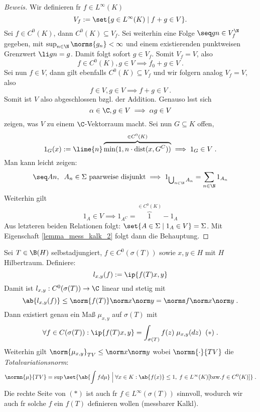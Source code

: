 \begin{proof}[Beweis]
	Wir definieren f\us r \(f\in L^\infty(K)\)
	\[V_f := \set{g\in L^\infty(K)\;\vert\; f+g \in V}.\]
	Sei \(f\in C^0(K)\), dann \(C^0(K)\subseteq V_f\). Sei weiterhin eine Folge \(\seq gn \in V_f^\N\) gegeben, mit \(\sup_{n\in\N} \norms{g_n} < \infty\) und einem existierenden punktweisen Grenzwert \(\li gn = g\). Damit folgt sofort \(g\in V_f\). Somit \(V_f = V\), also 
	\[f \in C^0(K), g\in V \implies f_0 + g \in V\;.\]
	Sei nun \(f\in V\), dann gilt ebenfalls \(C^0(K) \subseteq V_f\) und wir folgern analog \(V_f = V\), also 
	\[f\in V, g\in V \implies f + g \in V\;.\] 
	Somit ist $V$ also abgeschlossen bzgl. der Addition. Genauso l\as sst sich \[\alpha \in \C, g\in V \implies \alpha g \in V\] zeigen, was $V$ zu einem \(\C\)-Vektorraum macht.
	Sei nun \(G\subseteq K\) offen, 
	\[1_G(x) := \lime{n} \overbrace{\min(1,n\cdot \text{dist}(x, G^C))}^{\in C^0(K)} \implies 1_G \in V\;.\]
	Man kann leicht zeigen:
	\[\seq An,\;\; A_n \in \Sigma \text{ paarweise disjunkt} \implies 1_{\bigcup_{n\in\N} A_n} = \sum_{n\in\N} 1_{A_n}\]
	Weiterhin gilt
	\[1_A\in V \implies 1_{A^C} = \overbrace{1}^{\in C^0(K)}-1_A\]
	Aus letzteren beiden Relationen folgt: \(\set{A\in \Sigma \;\vert\; 1_A\in V} = \Sigma\). Mit Eigenschaft \ref{lemma_mess_kalk_2} folgt dann die Behauptung.
\end{proof}

\begin{rem}
	Sei \(T\in \B(H)\) selbstadjungiert, \(f\in C^0(\sigma(T))\) sowie \(x,y \in H\) mit $H$ Hilbertraum. Definiere:
	\[l_{x,y}(f):= \ip{f(T)x,y}\]
	Damit ist \(l_{x,y}:C^0(\sigma(T)) \to \C\) linear und stetig mit
	\[\ab{l_{x,y}(f)} \leq \norm{f(T)} \norm x\norm y = \norms f \norm x \norm y\;.\]
	Dann existiert genau ein Ma\ss{} $\mu_{x,y}$ auf \(\sigma(T)\) mit 
	\[\forall f \in C(\sigma(T)): \ip{f(T)x,y} = \int_{\sigma(T)} f(z) \;\mu_{x,y}(dz)\;\;(*)\;.\]
	Weiterhin gilt \(\norm{\mu_{x,y}}_{TV} \leq \norm x\norm y\) wobei $\normn{\cdot}{TV}$ die \textit{Totalvariationsnorm}:
	\[\normn{\mu}{TV} = \sup\set{\ab{\int fd\mu}\;\Big\vert\; \forall x \in K: \ab{f(x)} \leq 1, \;f \in L^\infty(K)[\text{bzw.} f\in C^0(K)]}\;.\]
	Die rechte Seite von $(*)$ ist auch f\us r $f\in L^\infty(\sigma(T))$ sinnvoll, wodurch wir auch f\us r solche $f$ ein $f(T)$ definieren wollen (messbarer Kalk\us l).
	\label{rem_mess_kalk}
\end{rem}

